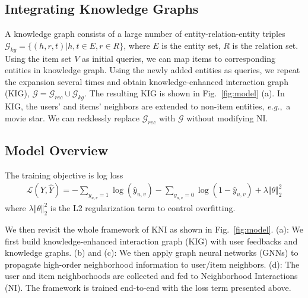 \documentclass[sigconf]{acmart}
\newcommand{\mG}{\mathcal{G}}
\newcommand{\eg}{\emph{e.g.},~}
\begin{document}
\subsection{Integrating Knowledge Graphs}\label{sec:kig}

A knowledge graph consists of a large number of entity-relation-entity triples $\mG_{kg} = \{(h, r, t)| h, t \in E, r \in R\}$, where $E$ is the entity set, $R$ is the relation set.
Using the item set $V$ as initial queries, we can map items to corresponding entities in knowledge graph. 
Using the newly added entities as queries, we repeat the expansion several times and obtain knowledge-enhanced interaction graph (KIG),
$\mG = \mG_{rec} \cup \mG_{kg}$. 
The resulting KIG is shown in Fig.~\ref{fig:model} (a). In KIG, the users' and items' neighbors are extended to non-item entities, \eg a movie star. We can recklessly replace $\mG_{rec}$ with $\mG$ without modifying NI.

\subsection{Model Overview}\label{sec:obj}
The training objective is log loss
\begin{align}
\mathcal{L}(Y, \hat{Y}) = - \sum_{y_{u,v} = 1} \log(\hat{y}_{u,v}) - \sum_{y_{u,v} = 0} \log(1 - \hat{y}_{u,v}) + \lambda \Vert \theta \Vert_2^2 \label{eq:loss}
\end{align}
where $\lambda \Vert \theta \Vert_2^2$ is the L2 regularization term to control overfitting.

We then revisit the whole framework of KNI as shown in Fig.~\ref{fig:model}. (a): We first build knowledge-enhanced interaction graph (KIG) with user feedbacks and knowledge graphs. (b) and (c): We then apply graph neural networks (GNNs) to propagate high-order neighborhood information to user/item neighbors. (d): The user and item neighborhoods are collected and fed to Neighborhood Interactions (NI). The framework is trained end-to-end with the loss term presented above.
\end{document}
